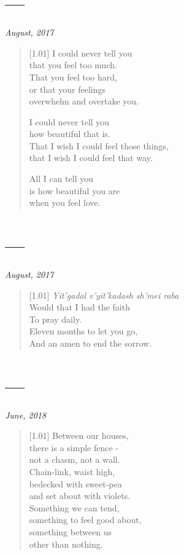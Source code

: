 \section*{---}

\hfill\textit{August, 2017}

\begin{verse}[1.01\textwidth]
I could never tell you\\
that you feel too much.\\
That you feel too hard,\\
or that your feelings\\
overwhelm and overtake you.

I could never tell you\\
how beautiful that is.\\
That I wish I could feel those things,\\
that I wish I could feel that way.

All I can tell you\\
is how beautiful you are\\
when you feel love.
\end{verse}
\newpage

\section*{---}

\hfill\textit{August, 2017}

\begin{verse}[1.01\textwidth]
\textit{Yit'gadal v'yit'kadash sh'mei raba}\\
Would that I had the faith\\
To pray daily.\\
Eleven months to let you go,\\
And an amen to end the sorrow.
\end{verse}
\newpage

\section*{---}

\hfill\textit{June, 2018}

\begin{verse}[1.01\textwidth]
  Between our houses,\\
  there is a simple fence -\\
  not a chasm, not a wall.\\
  Chain-link, waist high,\\
  bedecked with sweet-pea\\
  and set about with violets.\\
  Something we can tend,\\
  something to feel good about,\\
  something between us\\
  other than nothing.
\end{verse}
\newpage

